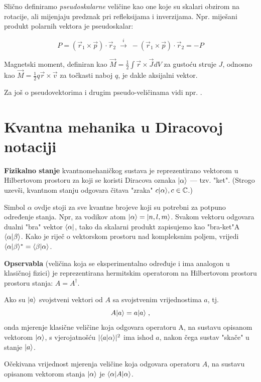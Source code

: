 Slično definiramo \emph{pseudoskalarne} veličine kao one koje su skalari
obzirom na rotacije, ali mijenjaju predznak pri refleksijama i inverzijama.
Npr. miješani produkt polarnih vektora je pseudoskalar:

\[
P = (\vec{r}_1 \times \vec{p}) \cdot \vec{r}_2  \; \stackrel{i}{\longrightarrow} \;
  - (\vec{r}_1 \times \vec{p}) \cdot \vec{r}_2 = - P
\]

Magnetski moment, definiran kao $\vec{M} = \frac{1}{2} \int \vec{r}
\times \vec{J} dV$ za gustoću struje $J$, odnosno kao
$\vec{M} = \frac{1}{2} q \vec{r} \times \vec{v}$ za točkasti
naboj $q$, je dakle aksijalni vektor.

Za još o pseudovektorima i drugim pseudo-veličinama vidi
npr. \cite{Arfken:1995}.


\chapter{Kvantna mehanika u Diracovoj notaciji}
\label{sec:qm}

\textbf{Fizikalno stanje} kvantnomehaničkog sustava
je reprezentirano vektorom u Hilbertovom prostoru za
koji se koristi Diracova oznaka
 $| \alpha \rangle$ --- tzv. "ket". 
(Strogo uzevši, kvantnom stanju odgovara
čitava "zraka" $c| \alpha \rangle, c\in\mathbb{C}$.)

Simbol $\alpha$ ovdje stoji za sve kvantne brojeve koji su potrebni za potpuno
određenje stanja. Npr, za vodikov atom $| \alpha \rangle=| n,l,m \rangle$.
Svakom vektoru odgovara dualni "bra" vektor $\langle \alpha |$, tako
da skalarni produkt zapisujemo kao "bra-ket"A
$\langle \alpha |\beta \rangle$. Kako je riječ o vektorskom prostoru
nad kompleksnim poljem, vrijedi
$\langle \alpha |\beta \rangle^{*} = \langle \beta |\alpha \rangle$.

\textbf{Opservabla} (veličina koja se eksperimentalno određuje i ima
 analogon u klasičnoj fizici) je reprezentirana hermitskim operatorom na
 Hilbertovom prostoru prostoru stanja: $A=A^{\dagger}$.

Ako su $| a \rangle$ svojstveni vektori od $A$ sa svojstvenim vrijednostima
$a$, tj.
\begin{displaymath}
                A| a \rangle=a| a \rangle \;,
\end{displaymath}
onda mjerenje klasične veličine koja odgovara operatoru A, na sustavu
opisanom vektorom $| \alpha \rangle$, s vjerojatnošću $|\langle a |\alpha\rangle|^2$
ima ishod $a$, nakon čega sustav "skače" u stanje $| a \rangle$.

Očekivana vrijednost mjerenja veličine koja odgovara
operatoru $A$, na sustavu opisanom vektorom stanja
$| \alpha \rangle$ je $\langle \alpha |A| \alpha \rangle$.

